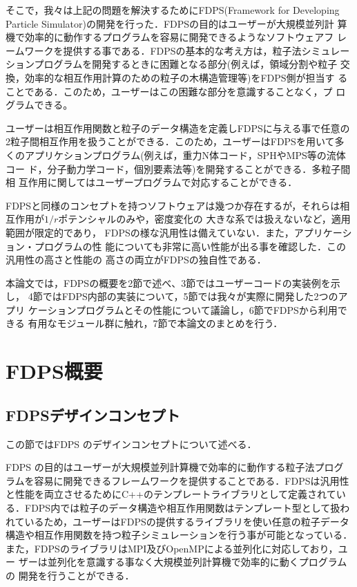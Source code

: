 \documentclass[submit,techreq,noauthor]{ipsj}
\begin{document}

そこで，我々は上記の問題を解決するためにFDPS(Framework for Developing
Particle Simulator)の開発を行った．FDPSの目的はユーザーが大規模並列計
算機で効率的に動作するプログラムを容易に開発できるようなソフトウェアフ
レームワークを提供する事である．FDPSの基本的な考え方は，粒子法シミュレー
ションプログラムを開発するときに困難となる部分(例えば，領域分割や粒子
交換，効率的な相互作用計算のための粒子の木構造管理等)をFDPS側が担当す
ることである．このため，ユーザーはこの困難な部分を意識することなく，プ
ログラムできる。

ユーザーは相互作用関数と粒子のデータ構造を定義しFDPSに与える事で任意の
2粒子間相互作用を扱うことができる．このため，ユーザーはFDPSを用いて多
くのアプリケションプログラム(例えば，重力N体コード，SPHやMPS等の流体コー
ド，分子動力学コード，個別要素法等)を開発することができる．多粒子間相
互作用に関してはユーザープログラムで対応することができる．

FDPSと同様のコンセプトを持つソフトウェアは幾つか存在するが，それらは相
互作用が$1/r$ポテンシャルのみや\cite{1995CoPhC..87..266W}，密度変化の
大きな系では扱えないなど\cite{Leisheng823}，適用範囲が限定的であり，
FDPSの様な汎用性は備えていない．また，アプリケーション・プログラムの性
能についても非常に高い性能が出る事を確認した．この汎用性の高さと性能の
高さの両立がFDPSの独自性である．

本論文では，FDPSの概要を2節で述べ、3節ではユーザーコードの実装例を示し，
4節ではFDPS内部の実装について，5節では我々が実際に開発した2つのアプリ
ケーションプログラムとその性能について議論し，6節でFDPSから利用できる
有用なモジュール群に触れ，7節で本論文のまとめを行う．

\section{FDPS概要}

\subsection{FDPSデザインコンセプト}

この節ではFDPS のデザインコンセプトについて述べる．

FDPS の目的はユーザーが大規模並列計算機で効率的に動作する粒子法プログ
ラムを容易に開発できるフレームワークを提供することである．FDPSは汎用性
と性能を両立させるためにC++のテンプレートライブラリとして定義されてい
る．FDPS内では粒子のデータ構造や相互作用関数はテンプレート型として扱わ
れているため，ユーザーはFDPSの提供するライブラリを使い任意の粒子データ
構造や相互作用関数を持つ粒子シミュレーションを行う事が可能となっている．
また，FDPSのライブラリはMPI及びOpenMPによる並列化に対応しており，ユー
ザーは並列化を意識する事なく大規模並列計算機で効率的に動くプログラムの
開発を行うことができる．
\end{document}
